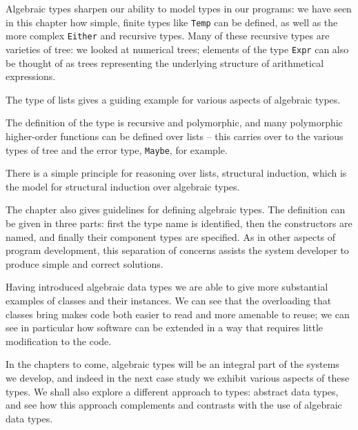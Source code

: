 \begin{summary}
Algebraic types sharpen our ability to model types in our programs: we have
seen in this chapter how simple, finite types like \texttt{Temp} can be defined,
as well as the more complex \texttt{Either} and recursive types. Many of these
recursive types are varieties of tree: we looked at numerical trees; elements
of the type \texttt{Expr} can also be thought of as trees representing the
underlying structure of arithmetical 
expressions.

The type of lists gives a guiding example for various aspects of algebraic
types.
\begin{titemize}
\item The definition of the type is
recursive and polymorphic, and many polymorphic higher-order
functions can be defined over lists -- this carries over to the various types
of tree and the error type, \texttt{Maybe}, for example.
\item There is a simple
principle for reasoning over lists, structural induction, which is the model
for structural induction over algebraic types.
\end{titemize}
The chapter also gives guidelines for defining algebraic types. The definition
can be given in three parts: first the type name is identified, then the
constructors are named, and finally their component types are specified. As
in other aspects of program development, this separation of concerns assists
the system developer to produce simple and correct solutions.

Having introduced algebraic data types we are able to give more substantial
examples of classes and their instances. We can see that the overloading that
classes bring makes code both easier to read and more amenable to reuse; we can see in
particular how software can be extended in a way that requires little
modification to the code.

In the chapters to come, algebraic types will be an integral part of the
systems we develop, and indeed in the next case study we exhibit various
aspects of these types. We shall also explore a different approach to types:
abstract data types, and see how this approach complements and contrasts with
the use of algebraic data types.


\end{summary}



%
